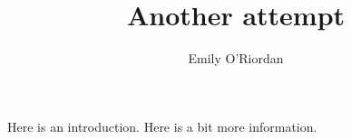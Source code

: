 \documentclass{article}
\title{Another attempt}
\author{Emily O'Riordan}
\begin{document}
\maketitle

Here is an introduction.
Here is a bit more information.


\end{document}
